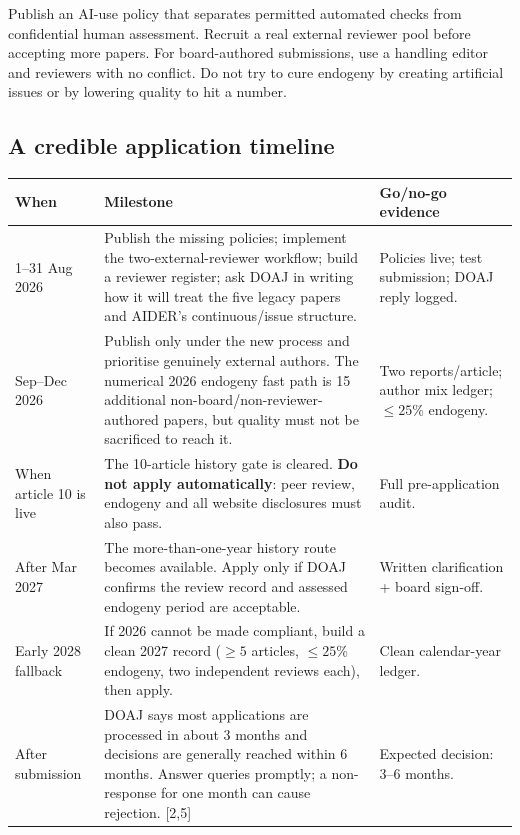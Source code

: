 \documentclass[11pt]{article}
\newcommand{\src}[1]{{\footnotesize\color{ink3}[#1]}}
\begin{document}
Publish an AI-use policy that separates permitted automated checks from confidential human assessment. Recruit a real external reviewer pool before accepting more papers. For board-authored submissions, use a handling editor and reviewers with no conflict. Do not try to cure endogeny by creating artificial issues or by lowering quality to hit a number.

\subsection{A credible application timeline}

{\small\renewcommand{\arraystretch}{1.2}
\begin{tabular}{@{}p{2.4cm} p{8.9cm} p{3.0cm}@{}}
\toprule
\textbf{When} & \textbf{Milestone} & \textbf{Go/no-go evidence} \\
\midrule
1--31 Aug 2026 & Publish the missing policies; implement the two-external-reviewer workflow; build a reviewer register; ask DOAJ in writing how it will treat the five legacy papers and AIDER's continuous/issue structure. & Policies live; test submission; DOAJ reply logged. \\
Sep--Dec 2026 & Publish only under the new process and prioritise genuinely external authors. The numerical 2026 endogeny fast path is 15 additional non-board/non-reviewer-authored papers, but quality must not be sacrificed to reach it. & Two reports/article; author mix ledger; $\leq25\%$ endogeny. \\
When article 10 is live & The 10-article history gate is cleared. \textbf{Do not apply automatically}: peer review, endogeny and all website disclosures must also pass. & Full pre-application audit. \\
After Mar 2027 & The more-than-one-year history route becomes available. Apply only if DOAJ confirms the review record and assessed endogeny period are acceptable. & Written clarification + board sign-off. \\
Early 2028 fallback & If 2026 cannot be made compliant, build a clean 2027 record ($\geq5$ articles, $\leq25\%$ endogeny, two independent reviews each), then apply. & Clean calendar-year ledger. \\
After submission & DOAJ says most applications are processed in about 3 months and decisions are generally reached within 6 months. Answer queries promptly; a non-response for one month can cause rejection. \src{2,5} & Expected decision: 3--6 months. \\
\bottomrule
\end{tabular}}
\end{document}
